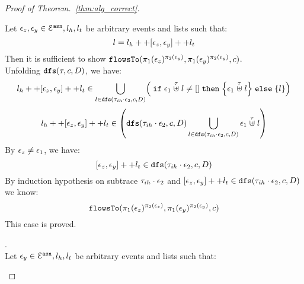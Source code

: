 \documentclass[a4paper,11pt]{article}
\begin{document}
\begin{proof}[Proof of Theorem.~\ref{thm:alg_correct}]
\begin{case}
\begin{subcase}
\begin{subsubcase}
Let $\mathtt{\epsilon}_z, \mathtt{\epsilon}_y \in \mathcal{E}^{\mathtt{{asn}}}, l_h, l_t$ be arbitrary events and lists such that:
\[
  l = l_h ++ [\mathtt{\epsilon}_z, \mathtt{\epsilon}_y] ++ l_t 
\]
%
Then it is sufficient to show $\mathtt{flowsTo}(\pi_1(\mathtt{\epsilon}_z)^{\pi_2(\mathtt{\epsilon}_y)}, \pi_1(\mathtt{\epsilon}_y)^{\pi_2(\mathtt{\epsilon}_y)}, c)$.
\\
Unfolding $\mathtt{dfs}(\mathtt{\tau}, c, D)$, we have:
%
\[
  l_h ++ [\event_z, \event_y] ++ l_t  \in 
     \bigcup\limits_{l \in \kw{dfs}(\trace_{ih} \cdot \event_2, c, D) }
  \left(  \eif \event_1 \stackrel{\trace}{\uplus} l \neq [] 
  \ethen \left\{ \event_1 \stackrel{\trace}{\uplus} l \right\} \eelse \left\{ l \right\}
  \right)
\]
%
\[
  l_h ++ [\event_z, \event_y] ++ l_t  \in 
  \left(  \kw{dfs}(\trace_{ih} \cdot \event_2, c, D) \bigcup\limits_{l \in \kw{dfs}(\trace_{ih} \cdot \event_2, c, D) } \event_1 \stackrel{\trace}{\uplus} l 
  \right)
\]
%
By $\mathtt{\epsilon}_z \neq \mathtt{\epsilon}_1$, we have:
\[
  [\mathtt{\epsilon}_z, \mathtt{\epsilon}_y] ++ l_t \in \mathtt{dfs}(\mathtt{\tau}_{ih} \cdot \mathtt{\epsilon}_2, c, D)
\]
%
%
%
By induction hypothesis on subtrace $\mathtt{\tau}_{ih} \cdot \mathtt{\epsilon}_2$ and $[\mathtt{\epsilon}_z, \mathtt{\epsilon}_y] ++ l_t 
  \in \mathtt{dfs}(\mathtt{\tau}_{ih} \cdot \mathtt{\epsilon}_2, c, D)$ we know:
\[
  \mathtt{flowsTo}(\pi_1(\mathtt{\epsilon}_z)^{\pi_2(\mathtt{\epsilon}_z)}, \pi_1(\mathtt{\epsilon}_y)^{\pi_2(\mathtt{\epsilon}_y)}, c)
\]
This case is proved.
%
\end{subsubcase}
%
\begin{subsubcase}.
\\
Let $\mathtt{\epsilon}_y \in \mathcal{E}^{\mathtt{{asn}}}, l_h, l_t$ be arbitrary events and lists such that:
\[                                                                                                                                                                                                                                                                                                                                                                                                          
\]
\end{subsubcase}
\end{subcase}
\end{case}
\end{proof}
\end{document}
